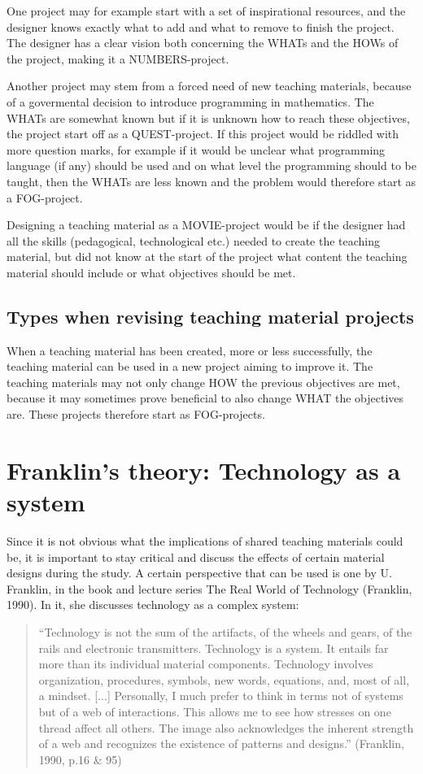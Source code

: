 One project may for example start with a set of inspirational resources, and the designer knows exactly what to add and what to remove to finish the project. The designer has a clear vision both concerning the WHATs and the HOWs of the project, making it a NUMBERS-project.

Another project may stem from a forced need of new teaching materials, because of a govermental decision to introduce programming in mathematics. The WHATs are somewhat known but if it is unknown how to reach these objectives, the project start off as a QUEST-project. If this project would be riddled with more question marks, for example if it would be unclear what programming language (if any) should be used and on what level the programming should to be taught, then the WHATs are less known and the problem would therefore start as a FOG-project.

Designing a teaching material as a MOVIE-project would be if the designer had all the skills (pedagogical, technological etc.) needed to create the teaching material, but did not know at the start of the project what content the teaching material should include or what objectives should be met.

\subsection{Types when revising teaching material projects}
When a teaching material has been created, more or less successfully, the teaching material can be used in a new project aiming to improve it. The teaching materials may not only change HOW the previous objectives are met, because it may sometimes prove beneficial to also change WHAT the objectives are. These projects therefore start as FOG-projects.



\section{Franklin's theory: Technology as a system} \label{franklintheory}
Since it is not obvious what the implications of shared teaching materials could be, it is important to stay critical and discuss the effects of certain material designs during the study. A certain perspective that can be used is one by U. Franklin, in the book and lecture series The Real World of Technology (Franklin, 1990). In it, she discusses technology as a complex system:

\begin{quote}
“Technology is not the sum of the artifacts, of the wheels and gears, of the rails and electronic transmitters. Technology is a system. It entails far more than its individual material components. Technology involves organization, procedures, symbols, new words, equations, and, most of all, a mindset. [...] Personally, I much prefer to think in terms not of systems but of a web of interactions. This allows me to see how stresses on one thread affect all others. The image also acknowledges the inherent strength of a web and recognizes the existence of patterns and designs.” (Franklin, 1990, p.16 \& 95)
\end{quote}

